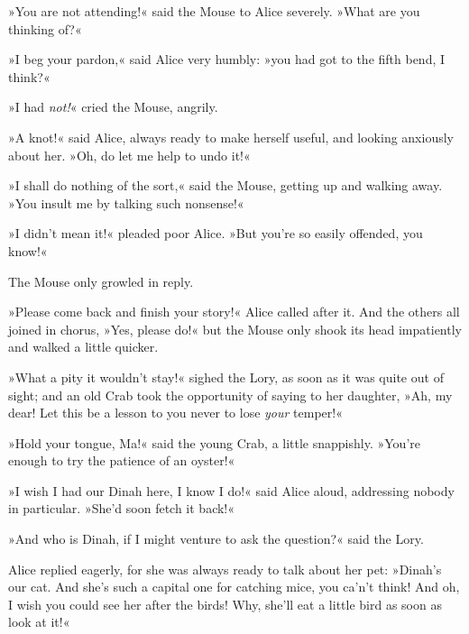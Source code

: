  \thispagestyle{empty}
\restoregeometry


»You are not attending!« said the Mouse to Alice severely. »What are you thinking of?«

»I beg your pardon,« said Alice very humbly: »you had got to the fifth bend, I think?«

»I had \textit{not!}« cried the Mouse, angrily.

»A knot!« said Alice, always ready to make herself useful, and looking anxiously about her. »Oh, do let me help to undo it!«

»I shall do nothing of the sort,« said the Mouse, getting up and walking away. »You insult me by talking such nonsense!«

»I didn't mean it!« pleaded poor Alice. »But you're so easily offended, you know!«

The Mouse only growled in reply.

»Please come back and finish your story!« Alice called after it. And the others all joined in chorus, »Yes, please do!« but the Mouse only shook its head impatiently and walked a little quicker.

»What a pity it wouldn't stay!« sighed the Lory, as soon as it was quite out of sight; and an old Crab took the opportunity of saying to her daughter, »Ah, my dear! Let this be a lesson to you never to lose \textit{your} temper!«

»Hold your tongue, Ma!« said the young Crab, a little snappishly. »You're enough to try the patience of an oyster!«

»I wish I had our Dinah here, I know I do!« said Alice aloud, addressing nobody in particular. »She'd soon fetch it back!«

»And who is Dinah, if I might venture to ask the question?« said the Lory.

Alice replied eagerly, for she was always ready to talk about her pet: »Dinah's our cat. And she's such a capital one for catching mice, you ca'n't think! And oh, I wish you could see her after the birds! Why, she'll eat a little bird as soon as look at it!«

